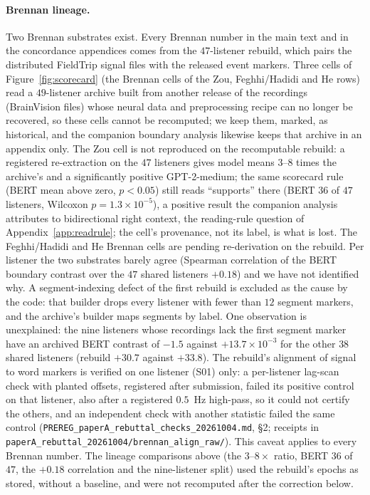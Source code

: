 \documentclass{article}
\begin{document}
\paragraph{Brennan lineage.}\label{app:brennan} Two Brennan substrates exist. Every Brennan number in
the main text and in the concordance appendices comes from the $47$-listener rebuild, which pairs the
distributed FieldTrip signal files with the released event markers. Three cells of
Figure~\ref{fig:scorecard} (the Brennan cells of the Zou, Feghhi/Hadidi and He rows) read a
$49$-listener archive built from another release of the recordings (BrainVision files) whose neural
data and preprocessing recipe can no longer be recovered, so these cells cannot be recomputed; we keep
them, marked, as historical, and the companion boundary analysis likewise keeps that archive in an
appendix only. The Zou cell is not reproduced on the recomputable rebuild: a registered re-extraction
on the $47$ listeners gives model means $3$--$8$ times the archive's and a significantly positive
GPT-2-medium; the same scorecard rule (BERT mean above zero, $p<0.05$) still reads ``supports'' there
(BERT $36$ of $47$ listeners, Wilcoxon $p = 1.3\times10^{-5}$), a positive result the companion
analysis attributes to bidirectional right context, the reading-rule question of
Appendix~\ref{app:readrule}; the cell's provenance, not its label, is what is lost. The Feghhi/Hadidi
and He Brennan cells are pending re-derivation on the rebuild. Per listener the two substrates barely
agree (Spearman correlation of the BERT boundary contrast over the $47$ shared listeners $+0.18$) and
we have not identified why. A segment-indexing defect of the first rebuild is excluded as the cause by
the code: that builder drops every listener with fewer than $12$ segment markers, and the archive's
builder maps segments by label. One observation is unexplained: the nine listeners whose recordings
lack the first segment marker have an archived BERT contrast of $-1.5$ against $+13.7\times10^{-3}$
for the other $38$ shared listeners (rebuild $+30.7$ against $+33.8$). The rebuild's alignment of
signal to word markers is verified on one listener (S01) only: a per-listener lag-scan check with
planted offsets, registered after submission, failed its positive control on that listener, also
after a registered $0.5$~Hz high-pass, so it could not certify the others, and an independent check
with another statistic failed the same control (\texttt{PREREG\_paperA\_rebuttal\_checks\_20261004.md},
\S2; receipts in \texttt{paperA\_rebuttal\_20261004/brennan\_align\_raw/}). This caveat applies to every Brennan
number. The lineage comparisons above (the $3$--$8\times$ ratio, BERT $36$ of $47$, the $+0.18$
correlation and the nine-listener split) used the rebuild's epochs as stored, without a baseline, and
were not recomputed after the correction below.
\end{document}

